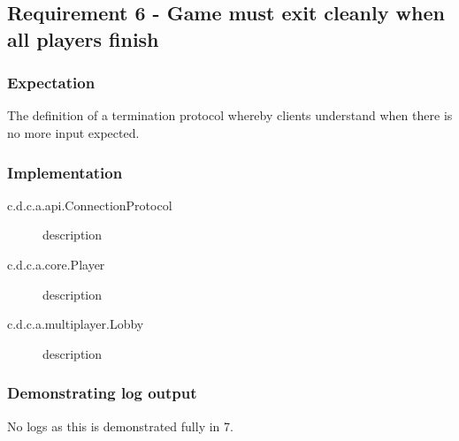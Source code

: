 \subsection{Requirement 6 - Game must exit cleanly when all players finish} 

\subsubsection{Expectation} 
The definition of a termination protocol whereby clients understand when there is no more input expected. 

\subsubsection{Implementation}

\begin{description}
	\item[c.d.c.a.api.ConnectionProtocol] description
	
	\item[c.d.c.a.core.Player] description
	
	\item[c.d.c.a.multiplayer.Lobby] description 
\end{description}

\subsubsection{Demonstrating log output} 

No logs as this is demonstrated fully in 7.